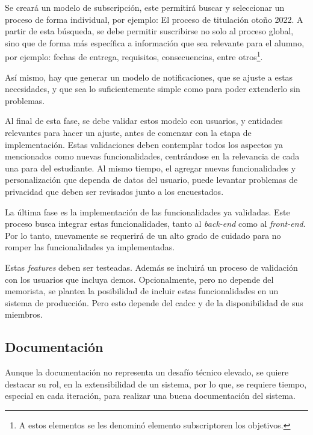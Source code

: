     \par Se creará un modelo de subscripción, este permitirá buscar y seleccionar un proceso de forma individual, por ejemplo: \guillemotleft El proceso de titulación otoño 2022\guillemotright.  A partir de esta búsqueda, se debe permitir suscribirse no solo al proceso global, sino que de forma más específica a información que sea relevante para el alumno, por ejemplo: fechas de entrega, requisitos, consecuencias, entre otros\footnote{A estos elementos se les denominó \guillemotleft elemento subscriptor\guillemotright en los objetivos.}.
    
    \par Así mismo, hay que generar un modelo de notificaciones, que se ajuste a estas necesidades, y que sea lo suficientemente simple como para poder extenderlo sin problemas.
   
    \par Al final de esta fase, se debe validar estos modelo con usuarios, y entidades relevantes para hacer un ajuste, antes de comenzar con la etapa de implementación. Estas validaciones deben contemplar todos los aspectos ya mencionados como nuevas funcionalidades, centrándose en la relevancia de cada una para del estudiante. Al mismo tiempo, el agregar nuevas funcionalidades y personalización que dependa de datos del usuario, puede levantar problemas de privacidad que deben ser revisados junto a los encuestados.

    \par La última fase es la implementación de las funcionalidades ya validadas. Este proceso busca integrar estas funcionalidades, tanto al \textit{back-end} como al \textit{front-end}. Por lo tanto, nuevamente se requerirá de un alto grado de cuidado para no romper las funcionalidades ya implementadas.
    \par Estas \textit{features} deben ser testeadas. Además se incluirá un proceso de validación con los usuarios que incluya demos. Opcionalmente, pero no depende del memorista, se plantea la posibilidad de incluir estas funcionalidades en un sistema de producción. Pero esto depende del \acrshort{cadcc} y de la disponibilidad de sus miembros.
    \subsection{Documentación}
    \par Aunque la documentación no representa un desafío técnico elevado, se quiere destacar su rol, en la extensibilidad de un sistema, por lo que, se requiere tiempo, especial en cada iteración, para realizar una buena documentación del sistema.
    

